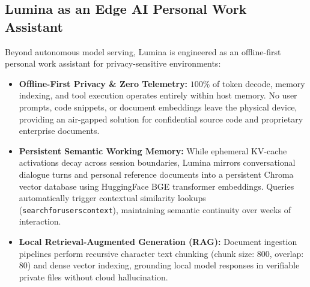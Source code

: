 \documentclass[11pt,a4paper]{article}
\newcommand{\code}[1]{\texttt{#1}}
\begin{document}
\subsection{Lumina as an Edge AI Personal Work Assistant}\label{sec:assistant}
Beyond autonomous model serving, Lumina is engineered as an offline-first personal work assistant for privacy-sensitive environments:
\begin{itemize}[leftmargin=*]
  \item \textbf{Offline-First Privacy \& Zero Telemetry:} $100\%$ of token decode, memory indexing, and tool execution operates entirely within host memory. No user prompts, code snippets, or document embeddings leave the physical device, providing an air-gapped solution for confidential source code and proprietary enterprise documents.
  \item \textbf{Persistent Semantic Working Memory:} While ephemeral KV-cache activations decay across session boundaries, Lumina mirrors conversational dialogue turns and personal reference documents into a persistent Chroma vector database using HuggingFace BGE transformer embeddings. Queries automatically trigger contextual similarity lookups (\code{searchforuserscontext}), maintaining semantic continuity over weeks of interaction.
  \item \textbf{Local Retrieval-Augmented Generation (RAG):} Document ingestion pipelines perform recursive character text chunking (chunk size: 800, overlap: 80) and dense vector indexing, grounding local model responses in verifiable private files without cloud hallucination.
\end{itemize}
\end{document}
